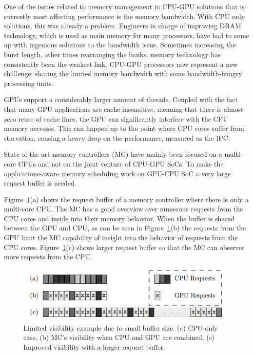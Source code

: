 \documentclass[10pt,journal,compsoc]{IEEEtran}
\begin{document}
One of the issues related to memory management in CPU-GPU solutions that is currently most affecting performance is the memory bandwidth. With CPU only solutions, this was already a problem. Engineers in charge of improving DRAM technology, which is used as main memory for many processors, have had to come up with ingenious solutions to the bandwidth issue. Sometimes increasing the burst length, other times rearranging the banks, memory technology has consistently been the weakest link. CPU-GPU processors now represent a new challenge: sharing the limited memory bandwidth with some bandwidth-hungry processing units.

GPUs support a considerably larger amount of threads. Coupled with the fact that many GPU applications are cache insensitive, meaning that there is almost zero reuse of cache lines, the GPU can significantly interfere with the CPU memory accesses. This can happen up to the point where CPU cores suffer from starvation, causing a heavy drop on the performance, measured as the IPC.

State of the art memory controllers (MC) have mainly been focused on a multi-core CPUs and not on the joint venture of CPU-GPU SoCs.  To make the applications-aware memory scheduling work on GPU-CPU SoC a very large request buffer is needed.
 
Figure~\ref{fig:buff}(a) shows the request buffer of a memory controller where there is only a multi-core CPU.  The MC has a good overview over numerous requests from the CPU cores and inside into their memory behavior.  When the buffer is shared between the GPU and CPU, as can be seen in Figure~\ref{fig:buff}(b) the requests from the GPU limit the MC capability of insight into the behavior of requests from the CPU cores.  Figure~\ref{fig:buff}(c) shows larger request buffer so that the MC can observer more requests from the CPU\cite{SmS}.

\begin{figure}[H]
	\centering
	\includegraphics[width = 8 cm]{graphics/no1.png}
	\caption{Limited visibility example due to small buffer size. (a) CPU-only
		case, (b) MC’s visibility when CPU and GPU are combined, (c) Improved
		visibility with a larger request buffer.\cite{SmS}}\label{fig:buff}
\end{figure} 
\end{document}
